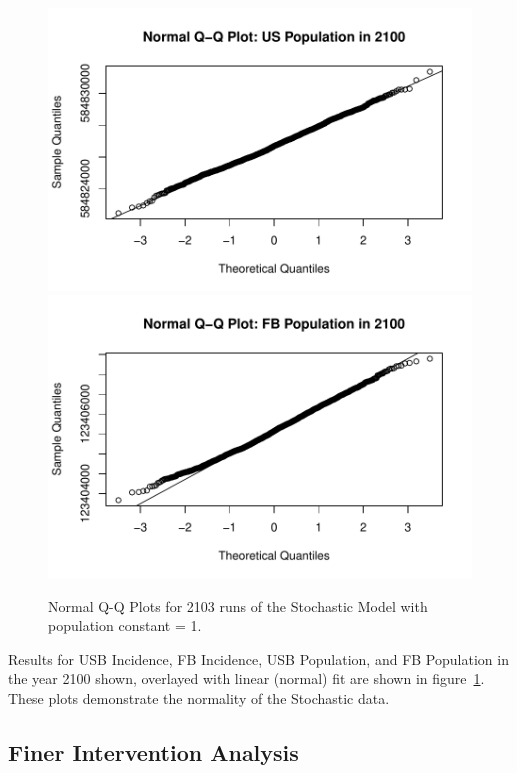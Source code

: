 \documentclass{amsart}
\begin{document}
\begin{figure}
    \includegraphics[scale=0.4]{figures/qqnormUSBPop.pdf}
    \includegraphics[scale=0.4]{figures/qqnormFBPop.pdf}
  \caption{Normal Q-Q Plots for 2103 runs of the Stochastic Model with population constant = 1.}
  \label{fig:qqnormPlots}
\end{figure}

Results for USB Incidence, FB Incidence, USB Population, and FB Population in the year
2100 shown, overlayed with linear (normal) fit are shown in
figure~\ref{fig:qqnormPlots}. These plots demonstrate the normality of the
Stochastic data. 
\subsection{Finer Intervention Analysis}
\end{document}
